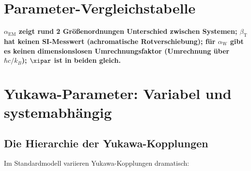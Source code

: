 	\section{Parameter-Vergleichstabelle}
	\label{sec:parameter_vergleich}
	
	\begin{table}[htbp]
		\centering
		\caption{Systematische Parameterunterschiede zwischen Einheitensystemen}
		\label{tab:parameter_vergleich}
	\end{table}
	
	\textbf{$\alpha_{\text{EM}}$ zeigt rund 2 Größenordnungen Unterschied zwischen Systemen; $\beta_{\text{T}}$ hat keinen SI-Messwert (achromatische Rotverschiebung); für $\alpha_{\text{W}}$ gibt es keinen dimensionslosen Umrechnungsfaktor (Umrechnung über $\hbar c/k_B$); $\xipar$ ist in beiden gleich.}
	
	\section{Yukawa-Parameter: Variabel und systemabhängig}
	\label{sec:yukawa_parameter}
	
	\subsection{Die Hierarchie der Yukawa-Kopplungen}
	\label{subsec:yukawa_hierarchie}
	
	Im Standardmodell variieren Yukawa-Kopplungen dramatisch:
	
